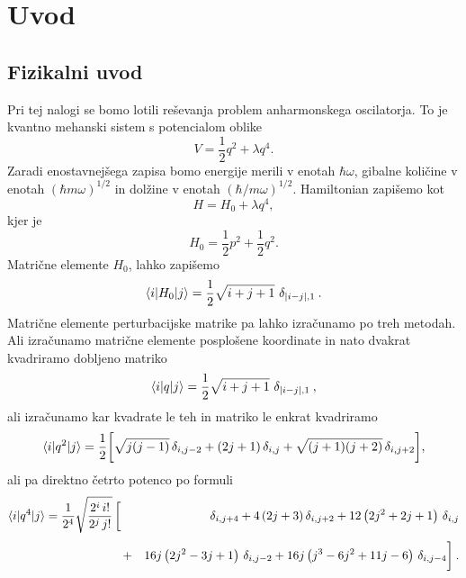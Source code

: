 \documentclass{porocilo}
\begin{document}
\maketitle

\section{Uvod}
\subsection{Fizikalni uvod}
Pri tej nalogi se bomo lotili reševanja problem anharmonskega oscilatorja. To je kvantno mehanski sistem s potencialom oblike
\begin{equation*}
    V = \frac{1}{2} q^2 + \lambda q^4.
\end{equation*}
Zaradi enostavnejšega zapisa bomo energije merili v enotah $\hbar \omega$, gibalne količine v enotah $(\hbar m \omega)^{1/2}$ in dolžine v enotah $(\hbar/m\omega)^{1/2}$. Hamiltonian zapišemo kot
\begin{equation*}
    H = H_0 + \lambda q^4,
\end{equation*}
kjer je
\begin{equation*}
    H_0 = \frac{1}{2} p^2 + \frac{1}{2} q^2.
\end{equation*}
Matrične elemente $H_0$, lahko zapišemo
\begin{equation*}
    \langle i|H_0|j \rangle = {1\over 2} \sqrt{i+j+1}\,\, \delta_{|i-j|,1} \>.
\end{equation*}
Matrične elemente perturbacijske matrike pa lahko izračunamo po treh metodah. Ali izračunamo matrične elemente posplošene koordinate in nato dvakrat kvadriramo dobljeno matriko
\begin{equation*}
    \langle i | q | j \rangle = {1\over 2} \sqrt{i+j+1}\,\, \delta_{|i-j|,1} \>,
\end{equation*}
ali izračunamo kar kvadrate le teh in matriko le enkrat kvadriramo
\begin{equation*}
    \langle i|q^2|j\rangle = {1\over 2} \biggl[
    {\sqrt{j(j-1)}} \, \delta_{i,j-2}
    + {(2j+1)} \, \delta_{i,j}
    + {\sqrt{(j+1)(j+2)}} \, \delta_{i,j+2} \biggr],
\end{equation*}
ali pa direktno četrto potenco po formuli
\begin{eqnarray*}
    \langle i|q^4|j\rangle
    = {1\over 2^4}\sqrt{2^i \, i!\over 2^{j} \, j! } \, \biggl[ \,
        &\,& \delta_{i,j+4} + 4\left(2j+3\right) \delta_{i,j+2}
        + 12 \left(2j^2+2j+1\right) \, \delta_{i,j} \\[3pt]
    &+& 16j \left(2j^2-3j+1\right) \, \delta_{i,j-2}
    + 16j\left(j^3-6j^2+11j-6\right) \, \delta_{i,j-4} \biggr] \>.
\end{eqnarray*}
\end{document}
